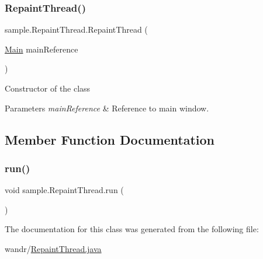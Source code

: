 \subsubsection{\texorpdfstring{Repaint\+Thread()}{RepaintThread()}}
{\footnotesize\ttfamily sample.\+Repaint\+Thread.\+Repaint\+Thread (\begin{DoxyParamCaption}\item[{\hyperlink{classsample_1_1_main}{Main}}]{main\+Reference }\end{DoxyParamCaption})}

Constructor of the class 
\begin{DoxyParams}{Parameters}
{\em main\+Reference} & Reference to main window. \\
\hline
\end{DoxyParams}


\subsection{Member Function Documentation}
\mbox{\label{classsample_1_1_repaint_thread_a607b591ec74e64a921015457fd9c66ab}} 
\subsubsection{\texorpdfstring{run()}{run()}}
{\footnotesize\ttfamily void sample.\+Repaint\+Thread.\+run (\begin{DoxyParamCaption}{ }\end{DoxyParamCaption})}



The documentation for this class was generated from the following file\+:\begin{DoxyCompactItemize}
\item 
wandr/\hyperlink{_repaint_thread_8java}{Repaint\+Thread.\+java}\end{DoxyCompactItemize}
